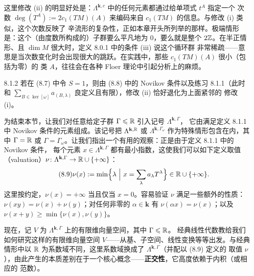 这里修改 (ii) 的明显好处是：$\Lambda^{\mathbf{k},c}$ 中的任何元素都通过给单项式 $t^A$ 指定一个
次数 $\deg(T^A):=2c_1(TM)(A)$ 来编码来自 $c_1(TM)$ 的信息。与修改 (i) 类似，这个次数反映了
辛流形的复杂性，正如本章开头所列举的那样。极端情形是：这个（由度数所构成的）子群要么平凡地为
$0$，要么就是整个 $2\mathbb{Z}$。在半正情形、且 $\dim M$ 很大时，定义 8.0.1 中的条件 (iii) 说这个循环群
非常稀疏——意思是当次数变化时会出现很大的跳跃。在实践中，那些 $c_1(TM)(A)$ 很小（包括为零）的
类 $A$，往往会在各种 Floer 理论中引起分析上的麻烦。

\begin{wrem}{8.1.2}
  若在 (8.7) 中令 $S=1$，则由 (8.8) 中的 Novikov 条件以及练习 8.1.1（此时和
  $\sum_{B\in\ker[\omega]}a_{(B,\lambda)}$ 良定义且有限），修改 (ii) 恰好退化为上面紧邻的
  修改 (i)。
\end{wrem}

为结束本节，让我们对任意给定子群 $\Gamma\leqslant\mathbb{R}$ 引入记号 $\Lambda^{\mathbf{k},\Gamma}$，
它由满足定义 8.1.1 中 Novikov 条件的元素组成。该记号把 $\Lambda^{\mathbf{k},\mathbb{R}}$ 或
$\Lambda^{\mathbf{k},\Gamma_\omega}$ 作为特殊情形包含在内，其中 $\Gamma=\mathbb{R}$ 或
$\Gamma=\Gamma_\omega$。让我们指出一个有用的观察：正是由于定义 8.1.1 中的 Novikov 条件，
每个元素 $x\in\Lambda^{\mathbf{k},\Gamma}$ 都有最小指数，这使我们可以如下定义取值
（valuation）$\nu\colon\Lambda^{\mathbf{k},\Gamma}\to\mathbb{R}\cup\{+\infty\}$：
\begin{equation}\tag{8.9}
  \nu(x):=\min\Bigl\{\lambda\ \Big|\ x=\sum_\lambda a_\lambda T^\lambda\Bigr\}
    \in\mathbb{R}\cup\{+\infty\}.
\end{equation}
这里按约定，$\nu(x)=+\infty$ 当且仅当 $x=0$。容易验证 $\nu$ 满足一些额外的性质：
$\nu(xy)=\nu(x)+\nu(y)$；对任何非零的 $\alpha\in\mathbf{k}$ 有 $\nu(\alpha x)=\nu(x)$；以及
$\nu(x+y)\geqslant\min\{\nu(x),\nu(y)\}$。

现在，记 $V$ 为 $\Lambda^{\mathbf{k},\Gamma}$ 上的有限维向量空间，其中 $\Gamma\leqslant\mathbb{R}$。
经典线性代数教给我们如何研究这样的有限维向量空间 $V$——从基、子空间、线性变换等等出发。与经典
情形中以 $\mathbb{R}$ 为系数域不同，这里系数域换成了 $\Lambda^{\mathbf{k},\Gamma}$（并配以 (8.9) 定义的
取值 $\nu$），由此产生的本质差别在于一个核心概念——\textbf{正交性}，它高度依赖于内积（或相应的
范数）。
